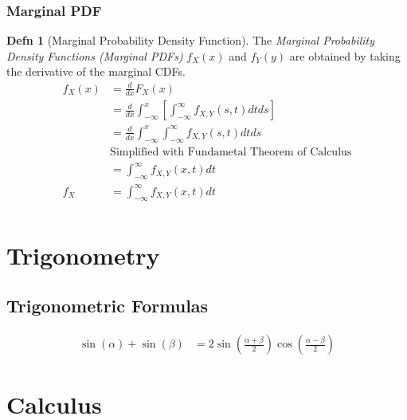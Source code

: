 \documentclass[10pt,letterpaper,final,twoside,notitlepage]{article}
\theoremstyle{plain}
\theoremstyle{definition}
\newtheorem{definition}{Defn}
\begin{document}
		\subsubsection{Marginal PDF} \label{subsubsec:Marginal PDF}
			\begin{definition}[Marginal Probability Density Function] \label{def:Marginal PDF}
				The \emph{Marginal Probability Density Functions (Marginal PDFs)} $f_{X} \left( x \right)$ and $f_{Y} \left( y \right)$ are obtained by taking the derivative of the marginal CDFs.
				\begin{equation}
					\begin{aligned}
						f_{X} \left( x \right) &= \frac{d}{dx} F_{X} \left( x \right) \\
						&= \frac{d}{dx} \int_{-\infty}^{x} \left[ \int_{-\infty}^{\infty} f_{X,Y} \left( s,t \right) dt ds \right] \\
						&= \frac{d}{dx} \int_{-\infty}^{x} \int_{-\infty}^{\infty} f_{X,Y} \left( s,t \right) dt ds \\
						&\text{Simplified with Fundametal Theorem of Calculus} \\
						&= \int_{-\infty}^{\infty} f_{X,Y} \left( x,t \right) dt \\
						f_{X} &= \int_{-\infty}^{\infty} f_{X,Y} \left( x,t \right) dt \\
					\end{aligned}
				\end{equation}
			\end{definition}

\appendix
{}
\section{Trigonometry} \label{app:Trig}
	\subsection{Trigonometric Formulas} \label{subsec:Trig Formulas}
		\begin{align}
			\sin \left( \alpha \right) + \sin \left( \beta \right) &= 2 \sin \left( \frac{\alpha + \beta}{2} \right) \cos\left( \frac{\alpha - \beta}{2} \right)  \label{eq:Sin plus Sin with diff Angles}
		\end{align}
\section{Calculus} \label{app:Calculus}
\end{document}
